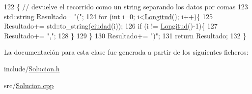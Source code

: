 \begin{DoxyCode}
122                              \{ \textcolor{comment}{// devuelve el recorrido como un string separando los datos por comas}
123     std::string Resultado= \textcolor{stringliteral}{"("};
124     \textcolor{keywordflow}{for} (\textcolor{keywordtype}{int} i=0; i<\hyperlink{class_solucion_af6c63418791149493213c4b1f5a5e9ab}{Longitud}(); i++)\{
125         Resultado+= std::to\_string(\hyperlink{class_solucion_afa9416d8604b0e2a17a623cf20287ae6}{ciudad}(i));
126         \textcolor{keywordflow}{if} (i != \hyperlink{class_solucion_af6c63418791149493213c4b1f5a5e9ab}{Longitud}()-1)\{
127             Resultado+= \textcolor{stringliteral}{","};
128         \}
129     \}
130     Resultado+= \textcolor{stringliteral}{")"};
131     \textcolor{keywordflow}{return} Resultado;
132 \}
\end{DoxyCode}


La documentación para esta clase fue generada a partir de los siguientes ficheros\+:\begin{DoxyCompactItemize}
\item 
include/\hyperlink{_solucion_8h}{Solucion.\+h}\item 
src/\hyperlink{_solucion_8cpp}{Solucion.\+cpp}\end{DoxyCompactItemize}

